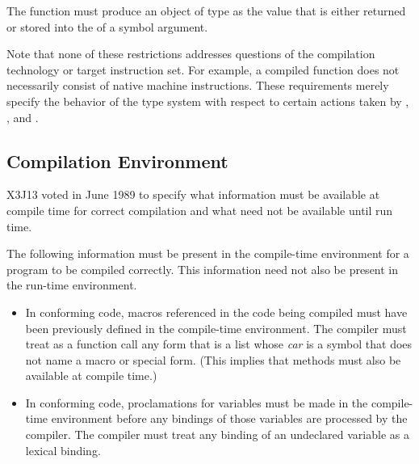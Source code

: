 The function  must produce an object of type
       as the value that is either returned
or stored into the  of a symbol argument.

Note that none of these restrictions addresses questions of the compilation technology or
target instruction set.  For example, a compiled function does not necessarily consist of
native machine instructions.  These requirements merely specify the behavior of the type
system with respect to certain actions taken by , , and
.

\subsection{Compilation Environment}

X3J13 voted in June 1989 
to specify what information must be available at compile time
for correct compilation
and what need not be available until run time.

The following information must be present in the compile-time
environment for a program to be compiled correctly.  This
information need not also be present in the run-time environment.
\begin{itemize}
\item In conforming code, macros referenced in the code being compiled
        must have been previously defined in the compile-time environment.
	The compiler must treat as a function call any form that is a list whose \emph{car} is
	a symbol that does not name a macro or special form.
  (This implies that  methods must also be available at
	compile time.)

\item In conforming code, proclamations for  variables must
        be made in the compile-time environment before any bindings of
        those variables are processed by the compiler.  The compiler
        must treat any binding of an undeclared variable as a lexical
        binding.
\end{itemize}


